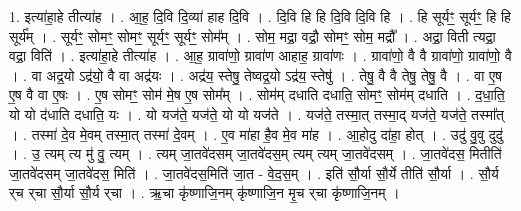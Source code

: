 \documentclass[17pt]{extarticle}
\begin{document}
1. इत्या॑हा॒हे तीत्या॑ह । . आ॒ह॒ दि॒वि दि॒व्या॑ हाह दि॒वि । . दि॒वि हि हि दि॒वि दि॒वि हि । . हि सूर्यꣳ॒॒ सूर्यꣳ॒॒ हि हि सूर्य᳚म् । . सूर्यꣳ॒॒ सोमꣳ॒॒ सोमꣳ॒॒ सूर्यꣳ॒॒ सूर्यꣳ॒॒ सोम᳚म् । . सोम॒ मद्रा॒ वद्रौ॒ सोमꣳ॒॒ सोम॒ मद्रौ᳚ । . अद्रा॒ विती त्यद्रा॒ वद्रा॒ विति॑ । . इत्या॑हा॒हे तीत्या॑ह । . आ॒ह॒ ग्रावा॑णो॒ ग्रावा॑ण आहाह॒ ग्रावा॑णः । . ग्रावा॑णो॒ वै वै ग्रावा॑णो॒ ग्रावा॑णो॒ वै । . वा अद्र॒यो ऽद्र॑यो॒ वै वा अद्र॑यः । . अद्र॑य॒ स्तेषु॒ तेष्वद्र॒यो ऽद्र॑य॒ स्तेषु॑ । . तेषु॒ वै वै तेषु॒ तेषु॒ वै । . वा ए॒ष ए॒ष वै वा ए॒षः । . ए॒ष सोमꣳ॒॒ सोम॑ मे॒ष ए॒ष सोम᳚म् । . सोम॑म् दधाति दधाति॒ सोमꣳ॒॒ सोम॑म् दधाति । . द॒धा॒ति॒ यो यो द॑धाति दधाति॒ यः । . यो यज॑ते॒ यज॑ते॒ यो यो यज॑ते । . यज॑ते॒ तस्मा॒त् तस्मा॒द् यज॑ते॒ यज॑ते॒ तस्मा᳚त् । . तस्मा॑ दे॒व मे॒वम् तस्मा॒त् तस्मा॑ दे॒वम् । . ए॒व मा॑हा है॒व मे॒व मा॑ह । . आ॒होदु दा॑हा॒ होत् । . उदु॑ वु॒वु दुदु॑ । . उ॒ त्यम् त्य मु॑ वु॒ त्यम् । . त्यम् जा॒तवे॑दसम् जा॒तवे॑दस॒म् त्यम् त्यम् जा॒तवे॑दसम् । . जा॒तवे॑दस॒ मितीति॑ जा॒तवे॑दसम् जा॒तवे॑दस॒ मिति॑ । . जा॒तवे॑दस॒मिति॑ जा॒त - वे॒द॒स॒म् । . इति॑ सौ॒र्या सौ॒र्ये तीति॑ सौ॒र्या । . सौ॒र्य र्‌च र्‌चा सौ॒र्या सौ॒र्य र्‌चा । . ऋ॒चा कृ॑ष्णाजि॒नम् कृ॑ष्णाजि॒न मृ॒च र्‌चा कृ॑ष्णाजि॒नम् । \newline
\end{document}
